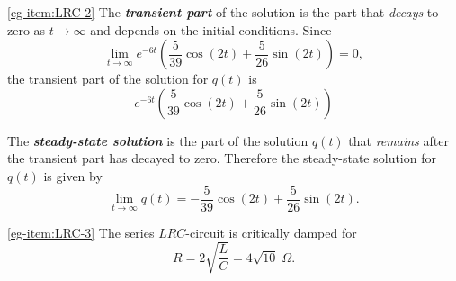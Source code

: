\begin{solution}
	\medskip
	
	\noindent\ref{eg-item:LRC-2}  The \textbf{\textit{transient part}} of the solution is the part that \emph{decays} to zero as $t\to\infty$
	and depends on the initial conditions. Since
	\[
	\lim\limits_{t\to\infty}
	e^{-6t}\!\left(\frac{5}{39}\cos(2t) + \frac{5}{26}\sin(2t)\right)=0,
	\] the transient part of the solution for $q(t)$ is
	\[e^{-6t}\!\left(\frac{5}{39}\cos(2t) + \frac{5}{26}\sin(2t)\right)\] 


	The \textbf{\textit{steady-state solution}} is the part of the solution $q(t)$ that \emph{remains} after the transient part
	has decayed to zero. Therefore the steady-state solution for $q(t)$ is  given by
	\[
	\lim_{t\to\infty} q(t) = -\frac{5}{39}\cos(2t) + \frac{5}{26}\sin(2t).
	\]
	
\noindent\ref{eg-item:LRC-3}  The series $LRC$-circuit is  critically damped for
\[R = 2 \sqrt{\frac{L}{C}} =  4\sqrt{10}\; \Omega.\]
\end{solution}




